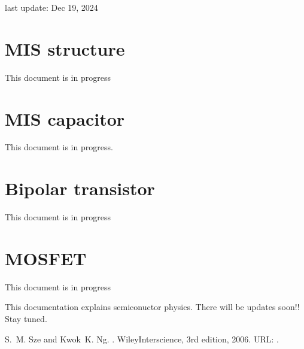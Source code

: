 \documentclass[letterpaper,10pt,english]{sphinxmanual}
\numberwithin{equation}{section}
\begin{document}
\sphinxAtStartPar
last update: Dec 19, 2024

\sphinxstepscope


\section{MIS structure}
\label{\detokenize{MIS_structure:mis-structure}}\label{\detokenize{MIS_structure::doc}}
\sphinxAtStartPar
This document is in progress

\sphinxstepscope


\section{MIS capacitor}
\label{\detokenize{MIS_capacitor:mis-capacitor}}\label{\detokenize{MIS_capacitor::doc}}
\sphinxAtStartPar
This document is in progress.

\sphinxstepscope


\section{Bipolar transistor}
\label{\detokenize{Bipolar_transistor:bipolar-transistor}}\label{\detokenize{Bipolar_transistor::doc}}
\sphinxAtStartPar
This document is in progress

\sphinxstepscope


\section{MOSFET}
\label{\detokenize{MOSFET:mosfet}}\label{\detokenize{MOSFET::doc}}
\sphinxAtStartPar
This document is in progress

\sphinxAtStartPar
This documentation explains semiconuctor physics.
There will be updates soon!!
Stay tuned.

\sphinxAtStartPar
{}

\begin{sphinxthebibliography}{1}
\sphinxAtStartPar
S. M. Sze and Kwok K. Ng. . Wiley\sphinxhyphen{}Interscience, 3rd edition, 2006. URL: .
\end{sphinxthebibliography}



\renewcommand{\indexname}{Index}
\printindex
\end{document}
